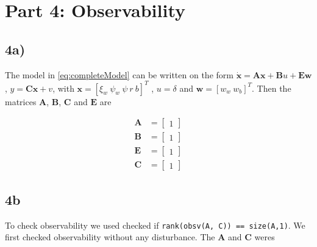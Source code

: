 
\section{Part 4: Observability}

\subsection{4a)}

The model in \cref{eq:completeModel} can be written on the form $\mathbf{\dot x} = \mathbf{A} \mathbf{x} + \mathbf{B}u + \mathbf{E}\mathbf{w}$, $ y = \mathbf{C}\mathbf{x} + v$, with $\mathbf{x} = [ \xi_w\ \psi_w\ \psi\ r\ b]^ T $ , $ u = \delta $ and $ \mathbf{w} = [w_w\ w_b]^T$. Then the matrices $\mathbf{A}$, $\mathbf{B}$, $\mathbf{C}$ and $\mathbf{E}$ are

\begin{subequations}
    \begin{align}
        \mathbf{A} &= \begin{bmatrix}
        1
        \end{bmatrix} \\
        \mathbf{B} &= \begin{bmatrix}
        1
        \end{bmatrix} \\
        \mathbf{E} &= \begin{bmatrix}
        1
        \end{bmatrix} \\
        \mathbf{C} &= \begin{bmatrix}
        1
        \end{bmatrix}
    \end{align}
\end{subequations}


\subsection{4b}

To check observability we used checked if \texttt{rank(obsv(A, C)) == size(A,1)}. We first checked observability without any disturbance. The $\mathbf{A}$ and $\mathbf{C}$ weres
